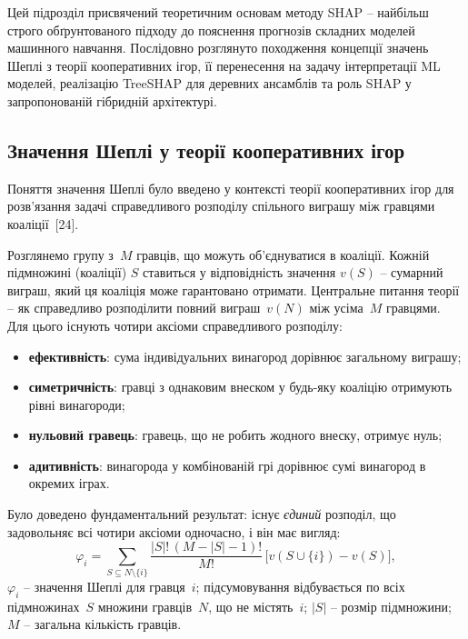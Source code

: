 \documentclass{bachelor_thesis}
\begin{document}
Цей підрозділ присвячений теоретичним основам методу SHAP -- найбільш строго обґрунтованого підходу до пояснення прогнозів складних моделей машинного навчання. Послідовно розглянуто походження концепції значень Шеплі з теорії кооперативних ігор, її перенесення на задачу інтерпретації ML моделей, реалізацію TreeSHAP для деревних ансамблів та роль SHAP у запропонованій гібридній архітектурі.

\subsection{Значення Шеплі у теорії кооперативних ігор}

Поняття значення Шеплі було введено у контексті теорії кооперативних ігор для розв'язання задачі справедливого розподілу спільного виграшу між гравцями коаліції~[24].

Розглянемо групу з~$M$ гравців, що можуть об'єднуватися в коаліції. Кожній підмножині (коаліції) $S$ ставиться у відповідність значення $v(S)$ -- сумарний виграш, який ця коаліція може гарантовано отримати. Центральне питання теорії -- як справедливо розподілити повний виграш~$v(N)$ між усіма~$M$ гравцями. Для цього існують чотири аксіоми справедливого розподілу:

\begin{itemize}
    \item \textbf{ефективність}: сума індивідуальних винагород дорівнює загальному виграшу;
    \item \textbf{симетричність}: гравці з однаковим внеском у будь-яку коаліцію отримують рівні винагороди;
    \item \textbf{нульовий гравець}: гравець, що не робить жодного внеску, отримує нуль;
    \item \textbf{адитивність}: винагорода у комбінованій грі дорівнює сумі винагород в окремих іграх.
\end{itemize}

Було доведено фундаментальний результат: існує \emph{єдиний} розподіл, що задовольняє всі чотири аксіоми одночасно, і він має вигляд:
\begin{equation}\label{eq:shapley}
\varphi_i = \sum_{S \subseteq N \setminus \{i\}} \frac{|S|! \, (M - |S| - 1)!}{M!} \, \bigl[v(S \cup \{i\}) - v(S)\bigr],
\end{equation}
 $\varphi_i$ -- значення Шеплі для гравця~$i$; підсумовування відбувається по всіх підмножинах~$S$ множини гравців~$N$, що не містять~$i$; $|S|$ -- розмір підмножини; $M$ -- загальна кількість гравців.
\end{document}
